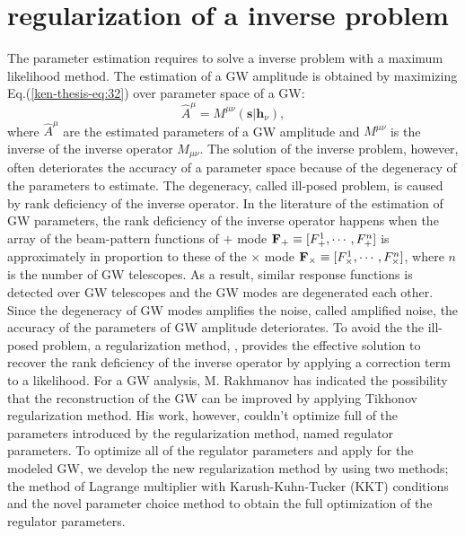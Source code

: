 \documentclass[%
 aps,
 prd,
 amsmath,amssymb,
 reprint,%
superscriptaddress
]{revtex4-1}
\begin{document}
\section{regularization of a inverse problem}\label{ken-short_thesis-sec:regul-inverse-probl}
The parameter estimation requires to solve a inverse problem with a maximum likelihood method. The estimation of a GW amplitude is obtained by maximizing Eq.(\ref{ken-thesis-eq:32}) over parameter space of a GW:
\begin{equation}\label{ken-thesis-eq:40}
 \hat{A}^{\mu} = M^{\mu\nu}\left(\bm{s}|\bm{h}_{\nu}\right),
\end{equation}
where 
$\hat{A}^{\mu}$ are the estimated parameters of a GW amplitude and
$M^{\mu\nu}$ is the inverse of the inverse operator
$M_{\mu\nu}$. The solution of the inverse problem, however, often deteriorates the accuracy of a parameter space because of the degeneracy of the parameters to estimate. The degeneracy, called ill-posed problem\cite{0264-9381-23-19-S05}, is caused by rank deficiency of the inverse operator. In the literature of the estimation of GW parameters, the rank deficiency of the inverse operator happens when the array of the
beam-pattern functions of
$+$ mode
${\bf F}_{+}\equiv[F^{1}_{+}, \cdots, F^{n}_{+}]$ is approximately in proportion to these of the
$\times$ mode
${\bf F}_{\times}\equiv[F^{1}_{\times}, \cdots, F^{n}_{\times}]$, where
$n$ is the number of GW telescopes. As a result, similar response functions is detected over GW telescopes and the GW modes are degenerated each other. Since the degeneracy of GW modes amplifies the noise, called amplified noise, the accuracy of the parameters of GW amplitude deteriorates. To avoid the the ill-posed problem, a regularization method\cite{engl1996regularization}, \cite{ENGL1988395}, \cite{10.2307/2008325} provides the effective solution to recover the rank deficiency of the inverse operator by applying a correction term to a likelihood. For a GW analysis, M. Rakhmanov has indicated the possibility that the reconstruction of the GW can be improved by applying Tikhonov regularization method\cite{0264-9381-23-19-S05}. His work, however, couldn't optimize full of the parameters introduced by the regularization method, named regulator parameters. To optimize all of the regulator parameters and apply for the modeled GW, we develop the new regularization method by using two methods; the method of Lagrange multiplier with Karush-Kuhn-Tucker (KKT) conditions\cite{Boyd:2004:CO:993483} and the novel parameter choice method to obtain the full optimization of the regulator parameters.
\end{document}

